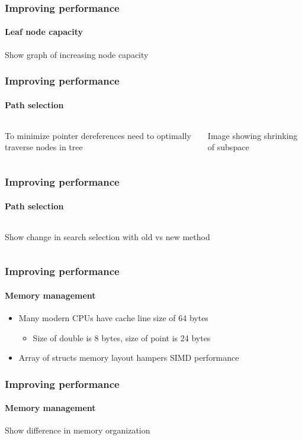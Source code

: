 
\begin{frame}
  \frametitle{Improving performance}
  \framesubtitle{Leaf node capacity}

  {\color{white} Show graph of increasing node capacity}

\end{frame}

\begin{frame}
  \frametitle{Improving performance}
  \framesubtitle{Path selection}

  \begin{columns}[T]
    \begin{column}{.5\textwidth}
      \begin{block}{}%
        {\color{white} To minimize pointer dereferences need to optimally%
        traverse nodes in tree}
      \end{block}
    \end{column}
    \begin{column}{.5\textwidth}
      \begin{block}{}
        Image showing shrinking of subspace
      \end{block}
    \end{column}
  \end{columns}

\end{frame}

\begin{frame}
  \frametitle{Improving performance}
  \framesubtitle{Path selection}

  \begin{columns}[T]
    \begin{column}{.5\textwidth}
      \begin{block}{}%
        {\color{white}Show change in search selection with old vs new method}
      \end{block}
    \end{column}
    \begin{column}{.5\textwidth}
      \begin{block}{}
      \end{block}
    \end{column}
  \end{columns}

\end{frame}

\begin{frame}
  \frametitle{Improving performance}
  \framesubtitle{Memory management}

  \begin{itemize}
    \item Many modern CPUs have cache line size of 64 bytes
      \begin{itemize}
        \item Size of double is 8 bytes, size of point is 24 bytes
      \end{itemize}
    \item Array of structs memory layout hampers SIMD performance 
  \end{itemize}

\end{frame}

\begin{frame}
  \frametitle{Improving performance}
  \framesubtitle{Memory management}

  \color{white} Show difference in memory organization

\end{frame}
